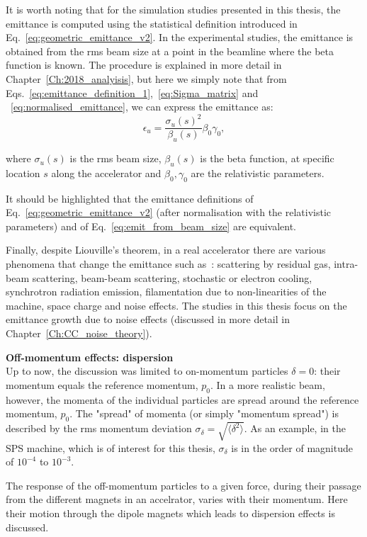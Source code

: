 It is worth noting that for the simulation studies presented in this thesis, the emittance is computed using the statistical definition introduced in Eq.~\eqref{eq:geometric_emittance_v2}. In the experimental studies, the emittance is obtained from the rms beam size at a point in the beamline where the beta function is known. The procedure is explained in more detail in Chapter~\ref{Ch:2018_analyisis}, but here we simply note that from Eqs.~\eqref{eq:emittance_definition_1},~\eqref{eq:Sigma_matrix} and ~\eqref{eq:normalised_emittance}, we can express the emittance as:
\begin{equation}\label{eq:emit_from_beam_size}
    \epsilon_{u} = \frac{\sigma_u(s)^2}{\beta_u(s)} \beta_0 \gamma_0,
\end{equation}

where $\sigma_u(s)$ is the rms beam size, $\beta_u(s)$ is the beta function, at specific location $s$ along the accelerator and $\beta_0, \gamma_0$ are the relativistic parameters. 

It should be highlighted that the emittance definitions of Eq.~\eqref{eq:geometric_emittance_v2} (after normalisation with the relativistic parameters) and of Eq.~\eqref{eq:emit_from_beam_size} are equivalent. 

Finally, despite Liouville's theorem, in a real accelerator there are various phenomena that change the emittance such as~\cite{Buon:216507}: scattering by residual gas, intra-beam scattering, beam-beam scattering, stochastic or electron cooling, synchrotron radiation emission, filamentation due to non-linearities of the machine, space charge and noise effects. The studies in this thesis focus on the emittance growth due to noise effects (discussed in more detail in Chapter~\ref{Ch:CC_noise_theory}).

\textbf{Off-momentum effects: dispersion}\\
Up to now, the discussion was limited to on-momentum particles $\delta=0$: their momentum equals the reference momentum, $p_0$. In a more realistic beam, however, the momenta of the individual particles are spread around the reference momentum, $p_0$. The "spread" of momenta (or simply "momentum spread") is described by the rms momentum deviation $\sigma_\delta = \sqrt{\langle \delta^2 \rangle}$. As an example, in the SPS machine, which is of interest for this thesis, $\sigma_\delta$ is in the order of magnitude of $10^{-4}$ to $10^{-3}$.

The response of the off-momentum particles to a given force, during their passage from the different magnets in an accelrator, varies with their momentum. Here their motion through the dipole magnets which leads to dispersion effects is discussed. 

